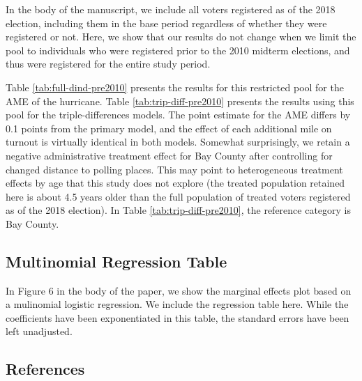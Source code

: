 \documentclass[
  12pt,
]{article}
\begin{document}
In the body of the manuscript, we include all voters registered as of the 2018 election, including them in the base period regardless of whether they were registered or not. Here, we show that our results do not change when we limit the pool to individuals who were registered prior to the 2010 midterm elections, and thus were registered for the entire study period.

Table \ref{tab:full-dind-pre2010} presents the results for this restricted pool for the AME of the hurricane. Table \ref{tab:trip-diff-pre2010} presents the results using this pool for the triple-differences models. The point estimate for the AME differs by 0.1 points from the primary model, and the effect of each additional mile on turnout is virtually identical in both models. Somewhat surprisingly, we retain a negative administrative treatment effect for Bay County after controlling for changed distance to polling places. This may point to heterogeneous treatment effects by age that this study does not explore (the treated population retained here is about 4.5 years older than the full population of treated voters registered as of the 2018 election). In Table \ref{tab:trip-diff-pre2010}, the reference category is Bay County.

\newpage
\begin{landscape}
\begin{singlespace}

\newpage

\end{singlespace}
\end{landscape}

\hypertarget{multinomial-regression-table}{%
\subsection*{Multinomial Regression Table}\label{multinomial-regression-table}}

In Figure 6 in the body of the paper, we show the marginal effects plot based on a mulinomial logistic regression. We include the regression table here. While the coefficients have been exponentiated in this table, the standard errors have been left unadjusted.

\begin{singlespace}

\end{singlespace}

\newpage

\hypertarget{references}{%
\subsection*{References}\label{references}}
\end{document}
